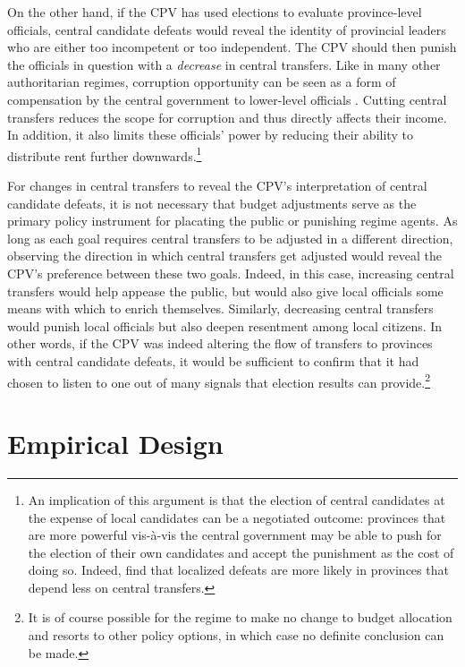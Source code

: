 \documentclass[12pt]{article}
\newcommand{\1}{\mathbbm{1}}
\begin{document}
On the other hand, if the CPV has used elections to evaluate province-level officials, central candidate defeats would reveal the identity of provincial leaders who are either too incompetent or too independent. The CPV should then punish the officials in question with a \textit{decrease} in central transfers. Like in many other authoritarian regimes, corruption opportunity can be seen as a form of compensation by the central government to lower-level officials \citep{Darden2008}. Cutting central transfers reduces the scope for corruption and thus directly affects their income. In addition, it also limits these officials' power by reducing their ability to distribute rent further downwards.\footnote{An implication of this argument is that the election of central candidates at the expense of local candidates can be a negotiated outcome: provinces that are more powerful vis-\`{a}-vis the central government may be able to push for the election of their own candidates and accept the punishment as the cost of doing so. Indeed, \citet{MaleskySchuler2011} find that localized defeats are more likely in provinces that depend less on central transfers.}

For changes in central transfers to reveal the CPV's interpretation of central candidate defeats, it is not necessary that budget adjustments serve as the primary policy instrument for placating the public or punishing regime agents. As long as each goal requires central transfers to be adjusted in a different direction, observing the direction in which central transfers get adjusted would reveal the CPV's preference between these two goals. Indeed, in this case, increasing central transfers would help appease the public, but would also give local officials some means with which to enrich themselves. Similarly, decreasing central transfers would punish local officials but also deepen resentment among local citizens. In other words, if the CPV was indeed altering the flow of transfers to provinces with central candidate defeats, it would be sufficient to confirm that it had chosen to listen to one out of many signals that election results can provide.\footnote{It is of course possible for the regime to make no change to budget allocation and resorts to other policy options, in which case no definite conclusion can be made.}

\section{Empirical Design}
\label{sec:methods}
\end{document}
